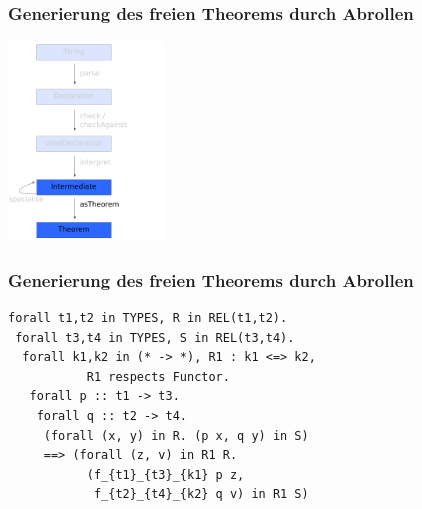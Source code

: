 \documentclass{beamer}
\begin{document}

\begin{frame}
\frametitle{Generierung des freien Theorems durch Abrollen}
\begin{center}
\includegraphics[height=200px]{overview-free-theorems-astheorem}
\end{center}
\end{frame}


\begin{frame}[fragile]
\frametitle{Generierung des freien Theorems durch Abrollen}

\begin{verbatim}
forall t1,t2 in TYPES, R in REL(t1,t2).
 forall t3,t4 in TYPES, S in REL(t3,t4).
  forall k1,k2 in (* -> *), R1 : k1 <=> k2,
           R1 respects Functor.
   forall p :: t1 -> t3.
    forall q :: t2 -> t4.
     (forall (x, y) in R. (p x, q y) in S)
     ==> (forall (z, v) in R1 R.
           (f_{t1}_{t3}_{k1} p z,
            f_{t2}_{t4}_{k2} q v) in R1 S)
\end{verbatim}
\end{frame}


\end{document}
